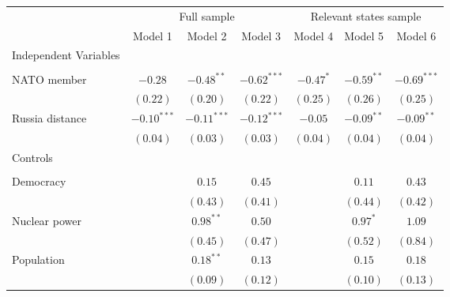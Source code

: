 
\begin{table}[h]
\begin{center}
\begin{tabular}{l c c c c c c}
\hline
 & \multicolumn{3}{c}{Full sample} & \multicolumn{3}{c}{Relevant states sample} \\
\cline{2-4} \cline{5-7}
 & Model 1 & Model 2 & Model 3 & Model 4 & Model 5 & Model 6 \\
\hline
Independent Variables &               &               &               &             &              &               \\
                      &               &               &               &             &              &               \\
\quad NATO member     & $-0.28$       & $-0.48^{**}$  & $-0.62^{***}$ & $-0.47^{*}$ & $-0.59^{**}$ & $-0.69^{***}$ \\
                      & $(0.22)$      & $(0.20)$      & $(0.22)$      & $(0.25)$    & $(0.26)$     & $(0.25)$      \\
\quad Russia distance & $-0.10^{***}$ & $-0.11^{***}$ & $-0.12^{***}$ & $-0.05$     & $-0.09^{**}$ & $-0.09^{**}$  \\
                      & $(0.04)$      & $(0.03)$      & $(0.03)$      & $(0.04)$    & $(0.04)$     & $(0.04)$      \\
Controls              &               &               &               &             &              &               \\
                      &               &               &               &             &              &               \\
\quad Democracy       &               & $0.15$        & $0.45$        &             & $0.11$       & $0.43$        \\
                      &               & $(0.43)$      & $(0.41)$      &             & $(0.44)$     & $(0.42)$      \\
\quad Nuclear power   &               & $0.98^{**}$   & $0.50$        &             & $0.97^{*}$   & $1.09$        \\
                      &               & $(0.45)$      & $(0.47)$      &             & $(0.52)$     & $(0.84)$      \\
\quad Population      &               & $0.18^{**}$   & $0.13$        &             & $0.15$       & $0.18$        \\
                      &               & $(0.09)$      & $(0.12)$      &             & $(0.10)$     & $(0.13)$      \\

\end{tabular}
\end{center}
\end{table}
